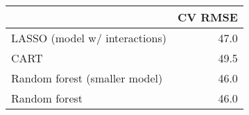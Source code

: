 
\begin{tabular}{lr}
\toprule
  & CV RMSE\\
\midrule
LASSO (model w/ interactions) & 47.0\\
CART & 49.5\\
Random forest (smaller model) & 46.0\\
Random forest & 46.0\\
\bottomrule
\end{tabular}